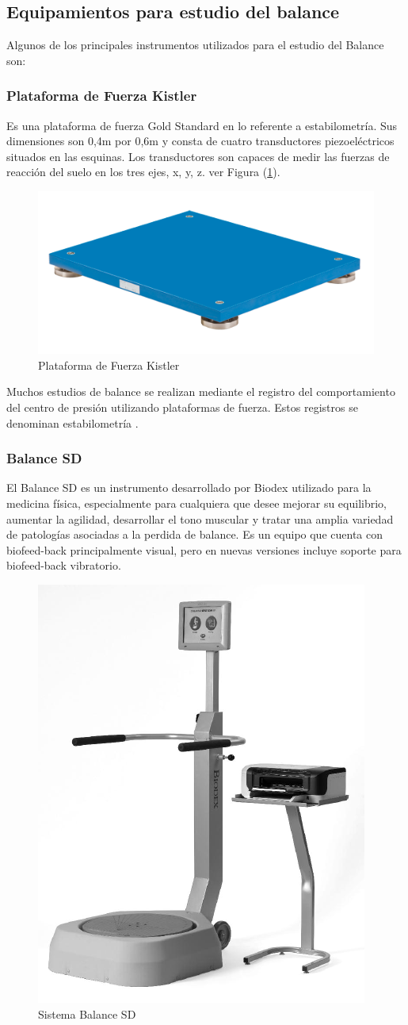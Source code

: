 \documentclass[12pt,a4paper]{article}
\begin{document}
\subsection{Equipamientos para estudio del balance} Algunos de los principales instrumentos utilizados para el estudio del Balance son:

\subsubsection{Plataforma de Fuerza Kistler} Es una plataforma de fuerza Gold Standard en lo referente a estabilometría\cite{donath_testing_2012}. Sus dimensiones son 0,4m por 0,6m y consta de cuatro transductores piezoeléctricos situados en las esquinas. Los transductores son capaces de medir las fuerzas de reacción del suelo en los tres ejes, x, y, z. ver Figura (\ref{fig:KistlerFP}).

\begin{figure}[H]
	\centering
	\includegraphics[width=0.5\linewidth]{images/KistlerFP}
	\caption{Plataforma de Fuerza Kistler}
	\label{fig:KistlerFP}
\end{figure}

Muchos estudios de balance se realizan mediante el registro del comportamiento del centro de presión utilizando plataformas de fuerza. Estos registros se denominan estabilometría \cite{scoppa_clinical_2013}.

\subsubsection{Balance SD} El Balance SD es un instrumento desarrollado por Biodex \cite{Biodex} utilizado para la medicina física, especialmente para cualquiera que desee mejorar su equilibrio, aumentar la agilidad, desarrollar el tono muscular y tratar una amplia variedad de patologías asociadas a la perdida de balance.
Es un equipo que cuenta con biofeed-back principalmente visual, pero en nuevas versiones incluye soporte para biofeed-back vibratorio.

\begin{figure}[H]
	\centering
	\includegraphics[width=0.25\linewidth]{images/BalanceSD}
	\caption{Sistema Balance SD}
	\label{fig:balanceSD}
\end{figure}
\end{document}
